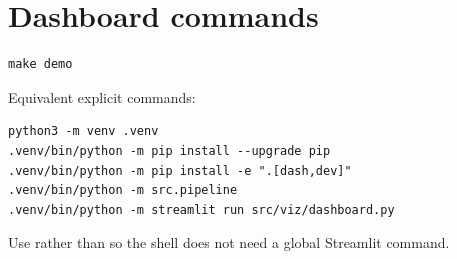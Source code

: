 \documentclass[11pt]{article}
\begin{document}
\section{Dashboard commands}
\begin{lstlisting}
make demo
\end{lstlisting}
Equivalent explicit commands:

\begin{lstlisting}
python3 -m venv .venv
.venv/bin/python -m pip install --upgrade pip
.venv/bin/python -m pip install -e ".[dash,dev]"
.venv/bin/python -m src.pipeline
.venv/bin/python -m streamlit run src/viz/dashboard.py
\end{lstlisting}
Use  rather than  so the shell does not need a global Streamlit command.
\end{document}

